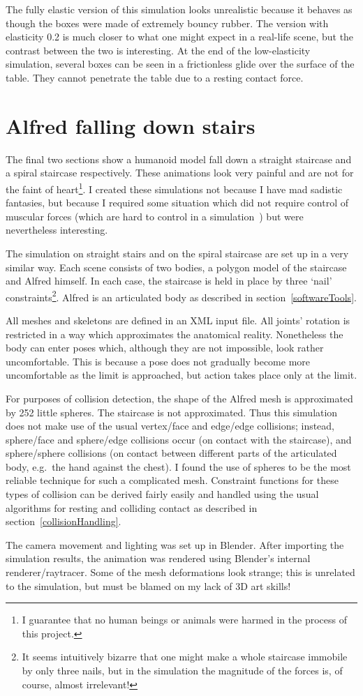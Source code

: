 The fully elastic version of this simulation looks unrealistic because it behaves as though the
boxes were made of extremely bouncy rubber. The version with elasticity 0.2 is much closer to what
one might expect in a real-life scene, but the contrast between the two is interesting. At the
end of the low-elasticity simulation, several boxes can be seen in a frictionless glide over the
surface of the table. They cannot penetrate the table due to a resting contact force.

\section{Alfred falling down stairs}

The final two sections show a humanoid model fall down a straight staircase and a spiral staircase
respectively. These animations look very painful and are not for the faint of heart\footnote{I
guarantee that no human beings or animals were harmed in the process of this project.}. I created
these simulations not because I have mad sadistic fantasies, but because I required some
situation which did not require control of muscular forces (which are hard to control in a
simulation~\cite{Green:91}) but were nevertheless interesting.

The simulation on straight stairs and on the spiral staircase are set up in a very similar way.
Each scene consists of two bodies, a polygon model of the staircase and Alfred himself. In each
case, the staircase is held in place by three `nail' constraints\footnote{It seems intuitively
bizarre that one might make a whole staircase immobile by only three nails, but in the simulation
the magnitude of the forces is, of course, almost irrelevant!}. Alfred is an articulated body
as described in section~\ref{softwareTools}.

All meshes and skeletons are defined in an XML input file. All joints' rotation is restricted in
a way which approximates the anatomical reality. Nonetheless the body can enter poses which,
although they are not impossible, look rather uncomfortable. This is because a pose does not
gradually become more uncomfortable as the limit is approached, but action takes place only at
the limit.

For purposes of collision detection, the shape of the Alfred mesh is approximated by 252 little
spheres. The staircase is not approximated. Thus this simulation does not make use of the usual
vertex/face and edge/edge collisions; instead, sphere/face and sphere/edge collisions occur
(on contact with the staircase), and sphere/sphere collisions (on contact between different parts
of the articulated body, e.g.\ the hand against the chest). I found the use of spheres to be the
most reliable technique for such a complicated mesh. Constraint functions for these types of
collision can be derived fairly easily and handled using the usual algorithms for resting and
colliding contact as described in section~\ref{collisionHandling}.

The camera movement and lighting was set up in Blender. After importing the simulation results,
the animation was rendered using Blender's internal renderer/raytracer. Some of the mesh
deformations look strange; this is unrelated to the simulation, but must be blamed on my lack of
3D art skills!
